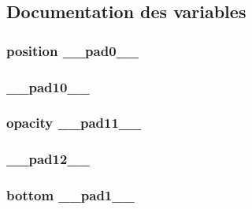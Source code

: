 \subsection{Documentation des variables}
\hypertarget{style_8css_ad9eedc94424c5d29cf38e583fb8bc973}{
\subsubsection[{\-\_\-\-\_\-pad0\-\_\-\-\_\-}]{\setlength{\rightskip}{0pt plus 5cm}position \-\_\-\-\_\-pad0\-\_\-\-\_\-}}\label{style_8css_ad9eedc94424c5d29cf38e583fb8bc973}
\hypertarget{style_8css_a3874a778fe05ca36cd60ff2872850a7f}{
\subsubsection[{\-\_\-\-\_\-pad10\-\_\-\-\_\-}]{ \-\_\-\-\_\-pad10\-\_\-\-\_\-}}\label{style_8css_a3874a778fe05ca36cd60ff2872850a7f}
\hypertarget{style_8css_a0a2c1506a2467b9384ff60f93957c78c}{
\subsubsection[{\-\_\-\-\_\-pad11\-\_\-\-\_\-}]{\setlength{\rightskip}{0pt plus 5cm}opacity \-\_\-\-\_\-pad11\-\_\-\-\_\-}}\label{style_8css_a0a2c1506a2467b9384ff60f93957c78c}
\hypertarget{style_8css_a7bfeb21dd7fb3ac1ba4015632ed9c491}{
\subsubsection[{\-\_\-\-\_\-pad12\-\_\-\-\_\-}]{ \-\_\-\-\_\-pad12\-\_\-\-\_\-}}\label{style_8css_a7bfeb21dd7fb3ac1ba4015632ed9c491}
\hypertarget{style_8css_ac76c6cee6e81528325adb720ce36cd7c}{
\subsubsection[{\-\_\-\-\_\-pad1\-\_\-\-\_\-}]{\setlength{\rightskip}{0pt plus 5cm}bottom \-\_\-\-\_\-pad1\-\_\-\-\_\-}}\label{style_8css_ac76c6cee6e81528325adb720ce36cd7c}
